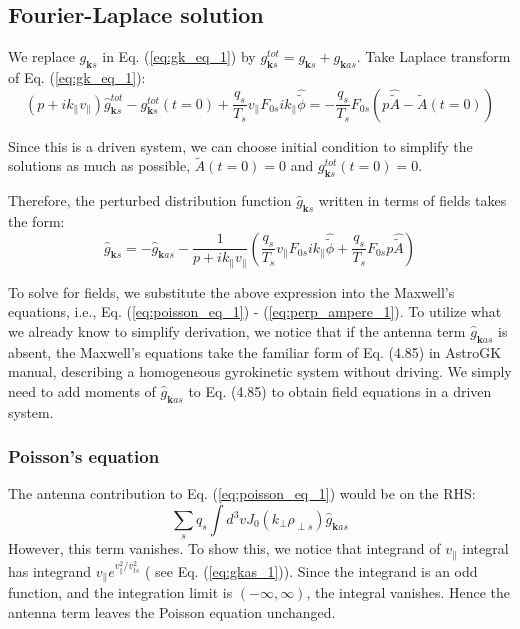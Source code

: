 \documentclass[12pt]{article}
\begin{document}
\subsection{Fourier-Laplace solution}
We replace $g_{\mathbf{k}s}$ in Eq. (\ref{eq:gk_eq_1}) by $g_{\mathbf{k}s}^{tot}=g_{\mathbf{k}s} +g_{\mathbf{k}as}  $. Take Laplace transform of Eq. (\ref{eq:gk_eq_1}):
%
\begin{equation}
(p + i k_\parallel v_\parallel) \hat{g}_{\mathbf{k}s}^{tot} - g_{\mathbf{k}s}^{tot} (t=0) + \frac{q_s}{T_s} v_\parallel F_{0s} i k_\parallel \hat{\tilde{\phi}} = -\frac{q_s}{T_s}F_{0s} \left(p \hat{\tilde{A}} - \tilde{A} (t=0)\right)
\end{equation}

Since this is a driven system, we can choose initial condition to simplify the solutions as much as possible,  $\tilde{A} (t=0)=0$ and $g_{\mathbf{k}s}^{tot} (t=0) = 0$. 

Therefore, the perturbed distribution function $\hat{g}_{\mathbf{k}s}$ written in terms of fields takes the form:
\begin{equation}
\hat{g}_{\mathbf{k}s}  = -\hat{g}_{\mathbf{k}as} - \frac{1}{{p+ ik_\parallel v_\parallel}} \left(\frac{q_s}{T_s} v_\parallel F_{0s} i k_\parallel \hat{\tilde{\phi}} + \frac{q_s}{T_s}F_{0s} p \hat{\tilde{A}} \right)
\end{equation}

To solve for fields, we substitute the above expression into the Maxwell's equations, i.e., Eq. (\ref{eq:poisson_eq_1}) - (\ref{eq:perp_ampere_1}). To utilize what we already know to simplify derivation, we notice that if the antenna term $\hat{g}_{\mathbf{k}as}$ is absent, the Maxwell's equations take the familiar form of Eq. (4.85) in AstroGK manual, describing a homogeneous gyrokinetic system without driving. We simply need to add moments of $\hat{g}_{\mathbf{k}as}$ to Eq. (4.85) to obtain field equations in a driven system. 
\subsubsection{Poisson's equation}
The antenna contribution to Eq. (\ref{eq:poisson_eq_1}) would be on the RHS:
%
\begin{equation}
\sum_s q_s \int d^3 v J_0(k_\perp \rho_{\perp s}) \hat{g}_{\mathbf{k}as} 
\end{equation}
However, this term vanishes. To show this, we notice that integrand of $v_\parallel$ integral has integrand $v_\parallel  e^{v_\parallel^2/v_{ts}^2}$ ( see Eq. (\ref{eq:gkas_1})). Since the integrand is an odd function, and the integration limit is $(-\infty, \infty)$, the integral vanishes. Hence the antenna term leaves the Poisson equation unchanged.
\end{document}
